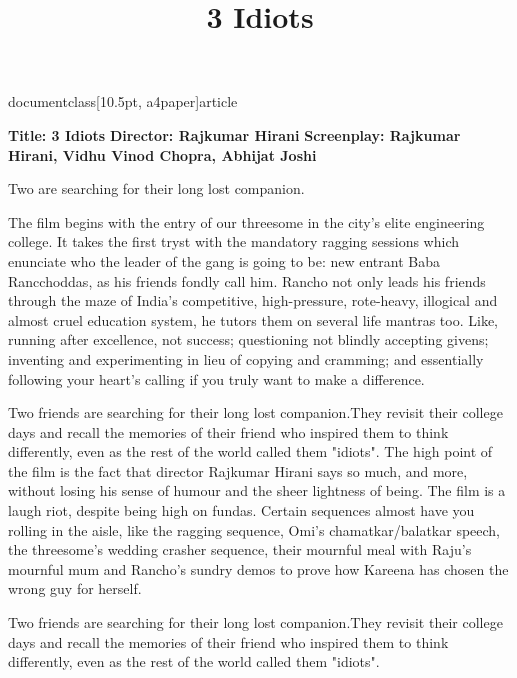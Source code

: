documentclass[10.5pt, a4paper]{article}
\usepackage{amsfonts}
\usepackage[top=0.3in,left=0.2in,right=0.2in]{geometry}
\usepackage{times}
\usepackage{tabularx}
\title{3 Idiots}

\maketitle
\textbf{Title: 3 Idiots}
\textbf{Director: Rajkumar Hirani}
\textbf{Screenplay: Rajkumar Hirani, Vidhu Vinod Chopra, Abhijat Joshi}

Two  are searching for their long lost companion.

The film begins with the entry of our threesome in the city's elite engineering college.
 It takes the first tryst with the mandatory ragging sessions which enunciate who the leader
 of the gang is going to be: new entrant Baba Rancchoddas, as his friends fondly call him. Rancho not only leads
 his friends through the maze of India's competitive, high-pressure, rote-heavy, illogical and almost cruel
 education system, he tutors them on several life mantras too. Like, running after excellence, not success;
 questioning not blindly accepting givens; inventing and experimenting in lieu of copying and cramming;
 and essentially following your heart's calling if you truly want to make
 a difference.

Two friends are searching for their long lost companion.They revisit their college days 
and recall the memories of their friend who inspired them to think differently, 
even as the rest of the world called them "idiots". 
The high point of the film is the fact that director Rajkumar Hirani says so much, and more, without losing his sense of humour and the sheer lightness of being. The film is a laugh riot, despite being high on fundas. Certain sequences almost have you rolling in the aisle, like the ragging sequence, Omi's chamatkar/balatkar speech, the threesome's wedding crasher sequence, their mournful meal with Raju's mournful mum and Rancho's sundry demos to prove how Kareena has chosen the wrong guy for herself.

Two friends are searching for their long lost companion.They revisit their college days 
and recall the memories of their friend who inspired them to think differently, 
even as the rest of the world called them "idiots". 

